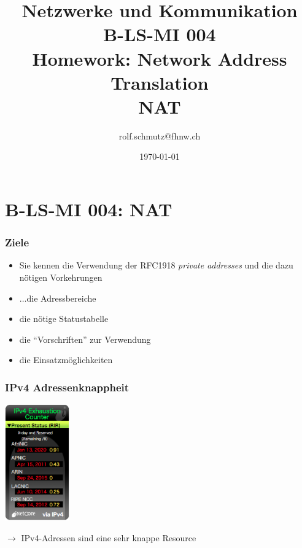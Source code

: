 \documentclass[ignorenonframetext]{beamer}
\date{\today}
\author{rolf.schmutz@fhnw.ch}
\institute{FHNW}
\title{Netzwerke und Kommunikation\\B-LS-MI 004\\Homework: Network Address Translation\\NAT}
\begin{document}

\section{B-LS-MI 004: NAT}



\begin{frame}
\titlepage
\end{frame}




\begin{frame}
\frametitle{Ziele}
\begin{itemize}
	\item Sie kennen die Verwendung der RFC1918 {\em private addresses} und die dazu n\"otigen Vorkehrungen
	  \item $\ldots$die Adressbereiche
	  \item die n\"otige Statustabelle
	  \item die ``Vorschriften'' zur Verwendung
	  \item die Einsatzm\"oglichkeiten
\end{itemize}
\end{frame}




\begin{frame}
\frametitle{IPv4 Adressenknappheit}
\begin{center}
	\includegraphics[height=5cm]{ipv4-exhaustion-counter}\\
\end{center}

$\rightarrow$ IPv4-Adressen sind eine sehr knappe Resource
\end{frame}
\end{document}
